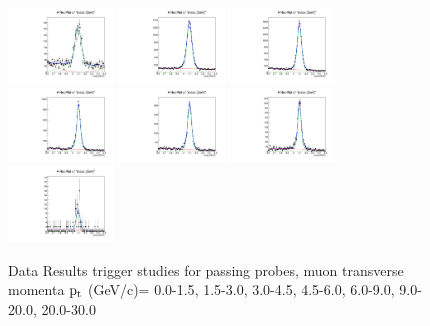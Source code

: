 \documentclass{article}
\begin{document}
\begin{figure}
    \includegraphics[width=0.25\textwidth]{../PlotsRooFitData/croofit_trk_pass_0.pdf}
    \includegraphics[width=0.25\textwidth]{../PlotsRooFitData/croofit_trk_pass_1.pdf}
    \includegraphics[width=0.25\textwidth]{../PlotsRooFitData/croofit_trk_pass_2.pdf}
    \includegraphics[width=0.25\textwidth]{../PlotsRooFitData/croofit_trk_pass_3.pdf}
    \includegraphics[width=0.25\textwidth]{../PlotsRooFitData/croofit_trk_pass_4.pdf}
    \includegraphics[width=0.25\textwidth]{../PlotsRooFitData/croofit_trk_pass_5.pdf}
    \includegraphics[width=0.25\textwidth]{../PlotsRooFitData/croofit_trk_pass_6.pdf}
    \caption{Data Results trigger studies for passing probes, muon transverse momenta
    $\rm p_{t}$ (GeV/c)= {0.0-1.5}, {1.5-3.0}, {3.0-4.5}, {4.5-6.0}, 
    {6.0-9.0}, {9.0-20.0}, {20.0-30.0}}
\end{figure}
\end{document}
